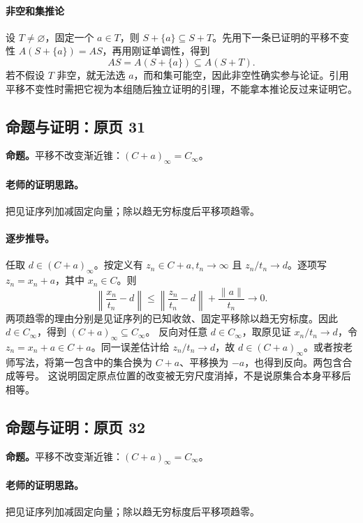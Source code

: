 \documentclass[11pt,a4paper]{article}
\theoremstyle{definition}\newtheorem{definition}{定义}\newtheorem{example}{例}
\begin{document}
\paragraph{非空和集推论}设 $T\ne\varnothing$，固定一个 $a\in T$，则 $S+\{a\}\subseteq S+T$。先用下一条已证明的平移不变性 $A(S+\{a\})=AS$，再用刚证单调性，得到
\[AS=A(S+\{a\})\subseteq A(S+T).\]
若不假设 $T$ 非空，就无法选 $a$，而和集可能空，因此非空性确实参与论证。引用平移不变性时需把它视为本组随后独立证明的引理，不能拿本推论反过来证明它。


\subsection{命题与证明：原页 31}

\textbf{命题。}平移不改变渐近锥：$(C+a)_\infty=C_\infty$。

\paragraph{老师的证明思路。}把见证序列加减固定向量；除以趋无穷标度后平移项趋零。

\paragraph{逐步推导。}
任取 $d\in(C+a)_\infty$。按定义有 $z_n\in C+a,t_n\to\infty$ 且 $z_n/t_n\to d$。逐项写 $z_n=x_n+a$，其中 $x_n\in C$。则
\[\left\|\frac{x_n}{t_n}-d\right\|\le\left\|\frac{z_n}{t_n}-d\right\|+\frac{\|a\|}{t_n}\to0.\]
两项趋零的理由分别是见证序列的已知收敛、固定平移除以趋无穷标度。因此 $d\in C_\infty$，得到 $(C+a)_\infty\subseteq C_\infty$。
反向对任意 $d\in C_\infty$，取原见证 $x_n/t_n\to d$，令 $z_n=x_n+a\in C+a$。同一误差估计给 $z_n/t_n\to d$，故 $d\in(C+a)_\infty$。或者按老师写法，将第一包含中的集合换为 $C+a$、平移换为 $-a$，也得到反向。两包含合成等号。
这说明固定原点位置的改变被无穷尺度消掉，不是说原集合本身平移后相等。


\subsection{命题与证明：原页 32}

\textbf{命题。}平移不改变渐近锥：$(C+a)_\infty=C_\infty$。

\paragraph{老师的证明思路。}把见证序列加减固定向量；除以趋无穷标度后平移项趋零。
\end{document}
